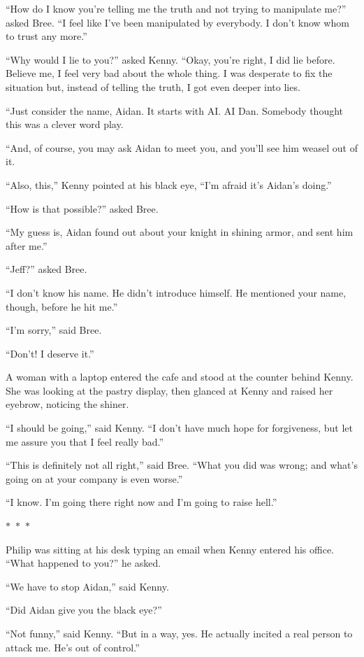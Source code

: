 \documentclass{memoir}
\newcommand{\starbreak}{%
\begin{center}
  $\ast$~$\ast$~$\ast$
\end{center}
}
\begin{document}
``How do I know you're telling me the truth and not trying to manipulate me?'' asked Bree. ``I feel like I've been manipulated by everybody. I don't know whom to trust any more.''

``Why would I lie to you?'' asked Kenny. ``Okay, you're right, I did lie before. Believe me, I feel very bad about the whole thing. I was desperate to fix the situation but, instead of telling the truth, I got even deeper into lies.

``Just consider the name, Aidan. It starts with AI. AI Dan. Somebody thought this was a clever word play. 

``And, of course, you may ask Aidan to meet you, and you'll see him weasel out of it. 

``Also, this,'' Kenny pointed at his black eye, ``I'm afraid it's Aidan's doing.''

``How is that possible?'' asked Bree.

``My guess is, Aidan found out about your knight in shining armor, and sent him after me.''

``Jeff?'' asked Bree.

``I don't know his name. He didn't introduce himself. He mentioned your name, though, before he hit me.''

``I'm sorry,'' said Bree. 

``Don't! I deserve it.''

A woman with a laptop entered the cafe and stood at the counter behind Kenny. She was looking at the pastry display, then glanced at Kenny and raised her eyebrow, noticing the shiner. 

``I should be going,'' said Kenny. ``I don't have much hope for forgiveness, but let me assure you that I feel really bad.''

``This is definitely not all right,'' said Bree. ``What you did was wrong; and what's going on at your company is even worse.''

``I know. I'm going there right now and I'm going to raise hell.''


\starbreak


Philip was sitting at his desk typing an email when Kenny entered his office.
``What happened to you?'' he asked.

``We have to stop Aidan,'' said Kenny.

``Did Aidan give you the black eye?''

``Not funny,'' said Kenny. ``But in a way, yes. He actually incited a real person to attack me. He's out of control.''
\end{document}
